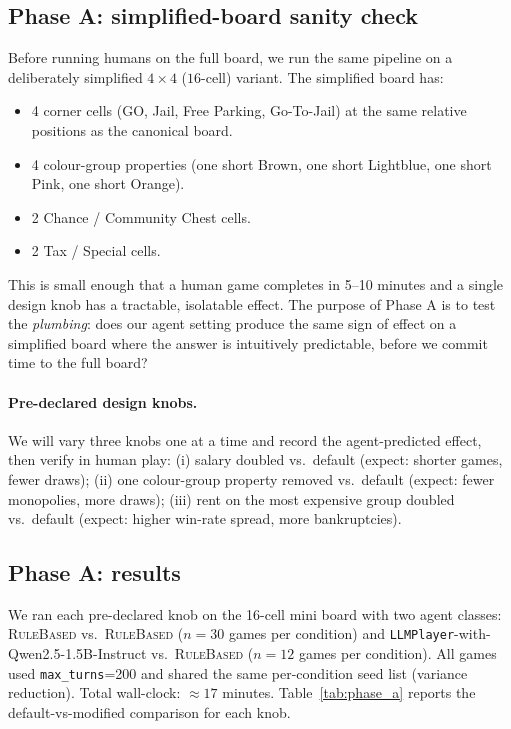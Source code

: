\documentclass[10pt]{article}
\begin{document}
\subsection{Phase A: simplified-board sanity check}

Before running humans on the full board, we run the same pipeline on a
deliberately simplified $4{\times}4$ ($16$-cell) variant. The simplified
board has:
\begin{itemize}[leftmargin=1.2em,itemsep=0pt]
\item 4 corner cells (GO, Jail, Free Parking, Go-To-Jail) at the same
relative positions as the canonical board.
\item 4 colour-group properties (one short Brown, one short Lightblue,
one short Pink, one short Orange).
\item 2 Chance / Community Chest cells.
\item 2 Tax / Special cells.
\end{itemize}
This is small enough that a human game completes in 5--10 minutes and a
single design knob has a tractable, isolatable effect. The purpose of
Phase A is to test the \emph{plumbing}: does our agent setting produce
the same sign of effect on a simplified board where the answer is
intuitively predictable, before we commit time to the full board?

\paragraph{Pre-declared design knobs.} We will vary three knobs one at a
time and record the agent-predicted effect, then verify in human play:
(i) salary doubled vs.\ default (expect: shorter games, fewer draws);
(ii) one colour-group property removed vs.\ default (expect:
fewer monopolies, more draws); (iii) rent on the most expensive group
doubled vs.\ default (expect: higher win-rate spread, more bankruptcies).

\subsection{Phase A: results}\label{sec:phase_a_results}

We ran each pre-declared knob on the 16-cell mini board with two agent
classes: \textsc{RuleBased} vs.\ \textsc{RuleBased} (\(n=30\) games per
condition) and \texttt{LLMPlayer}-with-Qwen2.5-1.5B-Instruct vs.\
\textsc{RuleBased} (\(n=12\) games per condition). All games used
\texttt{max\_turns}=200 and shared the same per-condition seed list
(variance reduction). Total wall-clock: \(\approx 17\) minutes.
Table~\ref{tab:phase_a} reports the default-vs-modified comparison
for each knob.
\end{document}
